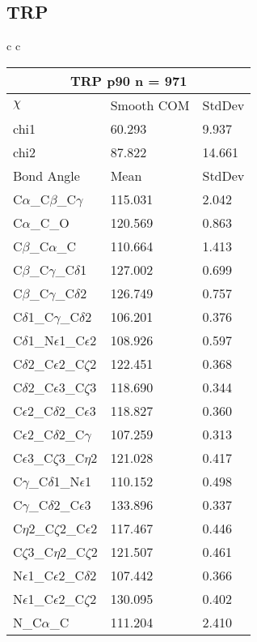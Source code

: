 \newpage
\subsection{TRP}

\begin{longtable}{ c c }

  \begin{tabular}{ l l l }
  \toprule
  \multicolumn{3}{c}{TRP \textbf{p90} n = 971} \\ \toprule
  $\chi$       & Smooth COM & StdDev \\ \midrule
  chi1 & 60.293 & 9.937 \\ 
  chi2 & 87.822 & 14.661 \\ \midrule
  Bond Angle   & Mean     & StdDev \\ \midrule
  C$\alpha$\_C$\beta$\_C$\gamma$ & 115.031 & 2.042\\
  C$\alpha$\_C\_O & 120.569 & 0.863\\
  C$\beta$\_C$\alpha$\_C & 110.664 & 1.413\\
  C$\beta$\_C$\gamma$\_C$\delta$1 & 127.002 & 0.699\\
  C$\beta$\_C$\gamma$\_C$\delta$2 & 126.749 & 0.757\\
  C$\delta$1\_C$\gamma$\_C$\delta$2 & 106.201 & 0.376\\
  C$\delta$1\_N$\epsilon$1\_C$\epsilon$2 & 108.926 & 0.597\\
  C$\delta$2\_C$\epsilon$2\_C$\zeta$2 & 122.451 & 0.368\\
  C$\delta$2\_C$\epsilon$3\_C$\zeta$3 & 118.690 & 0.344\\
  C$\epsilon$2\_C$\delta$2\_C$\epsilon$3 & 118.827 & 0.360\\
  C$\epsilon$2\_C$\delta$2\_C$\gamma$ & 107.259 & 0.313\\
  C$\epsilon$3\_C$\zeta$3\_C$\eta$2 & 121.028 & 0.417\\
  C$\gamma$\_C$\delta$1\_N$\epsilon$1 & 110.152 & 0.498\\
  C$\gamma$\_C$\delta$2\_C$\epsilon$3 & 133.896 & 0.337\\
  C$\eta$2\_C$\zeta$2\_C$\epsilon$2 & 117.467 & 0.446\\
  C$\zeta$3\_C$\eta$2\_C$\zeta$2 & 121.507 & 0.461\\
  N$\epsilon$1\_C$\epsilon$2\_C$\delta$2 & 107.442 & 0.366\\
  N$\epsilon$1\_C$\epsilon$2\_C$\zeta$2 & 130.095 & 0.402\\
  N\_C$\alpha$\_C & 111.204 & 2.410\\

\end{tabular}
\end{longtable}
